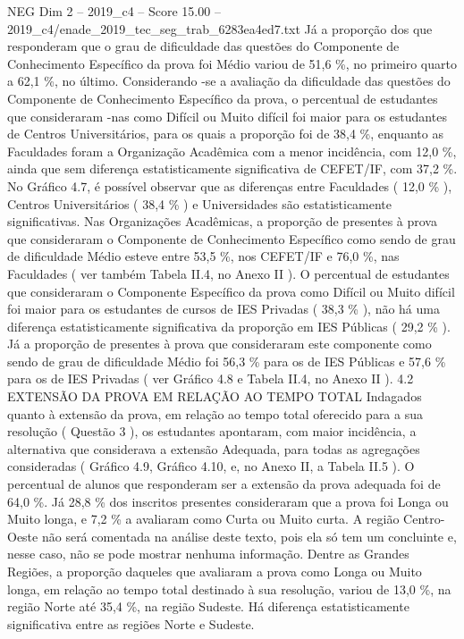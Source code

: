 \begin{textsample}{NEG Dim 2 – 2019\_c4 – Score 15.00 – 2019\_c4/enade\_2019\_tec\_seg\_trab\_6283ea4ed7.txt}
Já a proporção dos que responderam que o grau de dificuldade das questões do Componente de Conhecimento Específico da prova foi Médio variou de 51,6 \%, no primeiro quarto a 62,1 \%, no último.
Considerando -se a avaliação da dificuldade das questões do Componente de Conhecimento Específico da prova, o percentual de estudantes que consideraram -nas como Difícil ou Muito difícil foi maior para os estudantes de Centros Universitários, para os quais a proporção foi de 38,4 \%, enquanto as Faculdades foram a Organização Acadêmica com a menor incidência, com 12,0 \%, ainda que sem diferença estatisticamente significativa de CEFET/IF, com 37,2 \%.
No Gráfico 4.7, é possível observar que as diferenças entre Faculdades ( 12,0 \% ), Centros Universitários ( 38,4 \% ) e Universidades são estatisticamente significativas.
Nas Organizações Acadêmicas, a proporção de presentes à prova que consideraram o Componente de Conhecimento Específico como sendo de grau de dificuldade Médio esteve entre 53,5 \%, nos CEFET/IF e 76,0 \%, nas Faculdades ( ver também Tabela II.4, no Anexo II ).
O percentual de estudantes que consideraram o Componente Específico da prova como Difícil ou Muito difícil foi maior para os estudantes de cursos de IES Privadas ( 38,3 \% ), não há uma diferença estatisticamente significativa da proporção em IES Públicas ( 29,2 \% ).
Já a proporção de presentes à prova que consideraram este componente como sendo de grau de dificuldade Médio foi 56,3 \% para os de IES Públicas e 57,6 \% para os de IES Privadas ( ver Gráfico 4.8 e Tabela II.4, no Anexo II ). 4.2 EXTENSÃO DA PROVA EM RELAÇÃO AO TEMPO TOTAL Indagados quanto à extensão da prova, em relação ao tempo total oferecido para a sua resolução ( Questão 3 ), os estudantes apontaram, com maior incidência, a alternativa que considerava a extensão Adequada, para todas as agregações consideradas ( Gráfico 4.9, Gráfico 4.10, e, no Anexo II, a Tabela II.5 ).
O percentual de alunos que responderam ser a extensão da prova adequada foi de 64,0 \%.
Já 28,8 \% dos inscritos presentes consideraram que a prova foi Longa ou Muito longa, e 7,2 \% a avaliaram como Curta ou Muito curta.
A região Centro-Oeste não será comentada na análise deste texto, pois ela só tem um concluinte e, nesse caso, não se pode mostrar nenhuma informação.
Dentre as Grandes Regiões, a proporção daqueles que avaliaram a prova como Longa ou Muito longa, em relação ao tempo total destinado à sua resolução, variou de 13,0 \%, na região Norte até 35,4 \%, na região Sudeste.
Há diferença estatisticamente significativa entre as regiões Norte e Sudeste.

\end{textsample}
